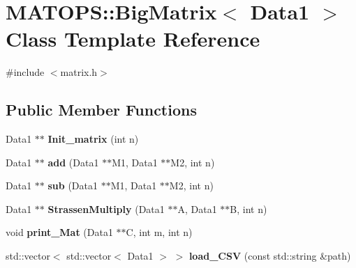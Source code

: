 \hypertarget{classMATOPS_1_1BigMatrix}{}\section{M\+A\+T\+O\+PS\+:\+:Big\+Matrix$<$ Data1 $>$ Class Template Reference}
\label{classMATOPS_1_1BigMatrix}


{\ttfamily \#include $<$matrix.\+h$>$}

\subsection*{Public Member Functions}
\begin{DoxyCompactItemize}
\item 
\mbox{\label{classMATOPS_1_1BigMatrix_a2730be4ce100cfdbaf1240703bd9cfb9}} 
Data1 $\ast$$\ast$ {\bfseries Init\+\_\+matrix} (int n)
\item 
\mbox{\label{classMATOPS_1_1BigMatrix_a175eecea05e419357d7475f5e3e938da}} 
Data1 $\ast$$\ast$ {\bfseries add} (Data1 $\ast$$\ast$M1, Data1 $\ast$$\ast$M2, int n)
\item 
\mbox{\label{classMATOPS_1_1BigMatrix_a5c89e7f360fb3cc32abbf6f1d430fb1f}} 
Data1 $\ast$$\ast$ {\bfseries sub} (Data1 $\ast$$\ast$M1, Data1 $\ast$$\ast$M2, int n)
\item 
\mbox{\label{classMATOPS_1_1BigMatrix_a71c665c80a1ca3731bd0d8ce37f0ace1}} 
Data1 $\ast$$\ast$ {\bfseries Strassen\+Multiply} (Data1 $\ast$$\ast$A, Data1 $\ast$$\ast$B, int n)
\item 
\mbox{\label{classMATOPS_1_1BigMatrix_af5223558c09e6c3c2fd3bcc5ccd08382}} 
void {\bfseries print\+\_\+\+Mat} (Data1 $\ast$$\ast$C, int m, int n)
\item 
\mbox{\label{classMATOPS_1_1BigMatrix_a43e1704cb38eb6d0121be5b71014eb8e}} 
std\+::vector$<$ std\+::vector$<$ Data1 $>$ $>$ {\bfseries load\+\_\+\+C\+SV} (const std\+::string \&path)
\item 
\mbox{\label{classMATOPS_1_1BigMatrix_a2b3003374e008ff98f763c29aa4e3c07}} 
$$
\end{DoxyCompactItemize}
